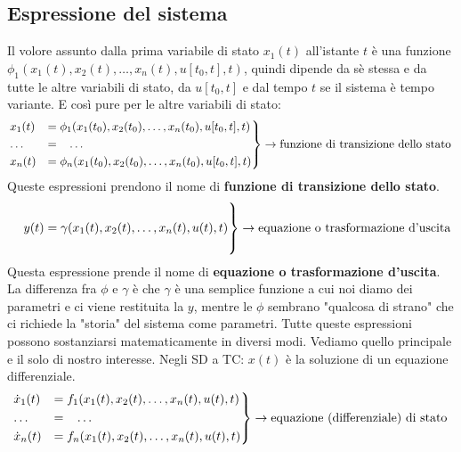 \subsection{Espressione del sistema}
Il volore assunto dalla prima variabile di stato $x_1(t)$ all'istante $t$ è una funzione $\phi_1(x_1(t),x_2(t), \dots, x_n(t), u[t_0,t], t)$, quindi dipende da sè stessa e da tutte le altre variabili di stato, da  $u[t_0,t]$ e dal tempo $t$ se il sistema è tempo variante. E così pure per le altre variabili di stato:
\[
    \begin{rcases}
        x_1(t) &= \phi_1(x_1(t_0),x_2(t_0), \dots, x_n(t_0), u[t_0,t], t)\\
        \dots \;\;\;&= \;\;\;\dots\\
        x_n(t) &= \phi_n(x_1(t_0),x_2(t_0), \dots, x_n(t_0), u[t_0,t], t)
    \end{rcases} \rightarrow \text{funzione di transizione dello stato}\;
\]
Queste espressioni prendono il nome di \textbf{funzione di transizione dello stato}.
\[
    \begin{rcases}
        \\
        \;\;\;\; y(t) = \gamma(x_1(t),x_2(t), \dots, x_n(t), u(t), t)\\
        \\
    \end{rcases} \rightarrow \text{equazione o trasformazione d'uscita}\;
\]
Questa espressione prende il nome di \textbf{equazione o trasformazione d'uscita}.\newline
\newline
La differenza fra $\phi$ e $\gamma$ è che $\gamma$ è una semplice funzione a cui noi diamo dei parametri e ci viene restituita la $y$, mentre le $\phi$ sembrano "qualcosa di strano" che ci richiede la "storia" del sistema come parametri.\newline
\newline
Tutte queste espressioni possono sostanziarsi matematicamente in diversi modi. Vediamo quello principale e il solo di nostro interesse.\newline
\newline
Negli SD a TC: $x(t)$ è la soluzione di un equazione differenziale.
\[
    \begin{rcases}
        \dot{x}_1(t) &= f_1(x_1(t),x_2(t), \dots, x_n(t), u(t), t)\\
        \dots \;\;\;&= \;\;\;\dots\\
        \dot{x}_n(t) &= f_n(x_1(t),x_2(t), \dots, x_n(t), u(t), t)
    \end{rcases} \rightarrow \text{equazione (differenziale) di stato}\;
\]
